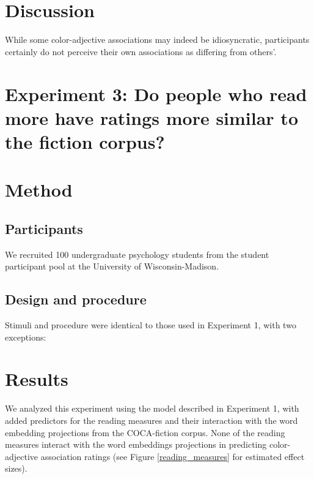 \documentclass[10pt,letterpaper]{article}
\begin{document}
\section{Discussion}
While some color-adjective associations may indeed be idiosyncratic, participants certainly do not perceive their own associations as differing from others'.

\section{Experiment 3: Do people who read more have ratings more similar to the fiction corpus?}
\section{Method}
\subsection{Participants}
We recruited 100 undergraduate psychology students from the student participant pool at the University of Wisconsin-Madison.
\subsection{Design and procedure}
Stimuli and procedure were identical to those used in Experiment 1, with two exceptions:

\section{Results}
We analyzed this experiment using the model described in Experiment 1, with added predictors for the reading measures and their interaction with the word embedding projections from the COCA-fiction corpus.
None of the reading measures interact with the word embeddings projections in predicting color-adjective association ratings (see Figure \ref{reading_measures} for estimated effect sizes).
\end{document}

